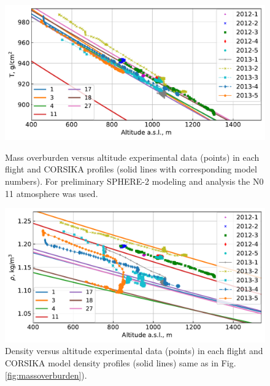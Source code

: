 \documentclass[universe,article,submit,moreauthors,pdftex]{Definitions/mdpi}
\begin{document}
\begin{figure}[tb]
    \begin{minipage}[t]{0.48\textwidth}
       \centering
       \includegraphics[width=\textwidth]{figs/atmosphere_T.pdf}
       \caption{Mass overburden versus altitude experimental data (points) in each flight and CORSIKA profiles (solid lines with corresponding model numbers). For preliminary SPHERE-2 modeling and analysis the N0 11 atmosphere was used.}
        \label{fig:massoverburden}
    \end{minipage}
    \hfill
    \begin{minipage}[t]{0.48\textwidth}
        \centering
        \includegraphics[width=\textwidth]{figs/atmosphere_rho.pdf}
        \caption{Density versus altitude experimental data (points) in each flight and CORSIKA model density profiles (solid lines) same as in Fig. \ref{fig:massoverburden}).}
        \label{fig:density}
   \end{minipage}
\end{figure}
\end{document}
